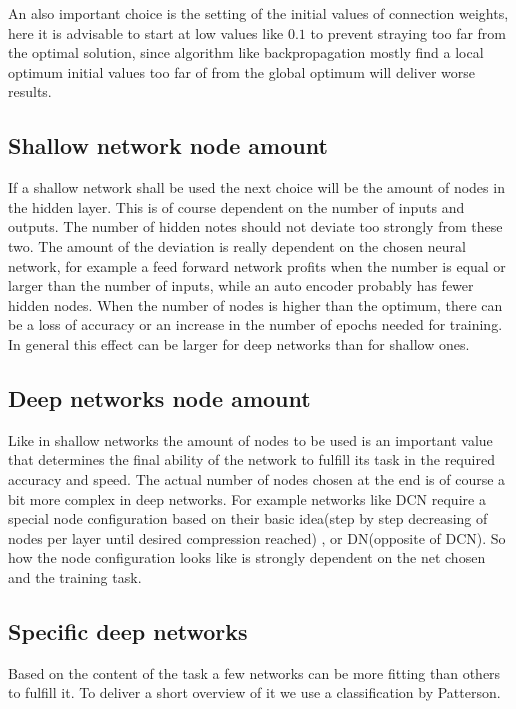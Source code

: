 \documentclass[conference]{IEEEtran}
\begin{document}

An also important choice is the setting of the initial values of connection weights, here it is advisable to start at low values like $0.1$ to prevent straying too far from the optimal solution, since algorithm like backpropagation mostly find a local optimum initial values too far of from the global optimum will deliver worse results.


\subsection{Shallow network node amount}
If a shallow network shall be used the next choice will be the amount of nodes in the hidden layer. This is of course dependent on the number of inputs and outputs. The number of hidden notes should not deviate too strongly from these two. The amount of the deviation is really dependent on the chosen neural network, for example a feed forward network profits when the number is equal or larger than the number of inputs, while an auto encoder probably has fewer hidden nodes. When the number of nodes is higher than the optimum, there can be a loss of accuracy or an increase in the number of epochs needed for training. In general this effect can be larger for deep networks than for shallow ones.


\subsection{Deep networks node amount}
Like in shallow networks the amount of nodes to be used is an important value that determines the final ability of the network to fulfill its task in the required accuracy and speed. The actual number of nodes chosen at the end is of course a bit more complex in deep networks. For example networks like DCN require a special node configuration based on their basic idea(step by step decreasing of nodes per layer until desired compression reached) , or DN(opposite of DCN). So how the node configuration looks like is strongly dependent on the net chosen and the training task.



\subsection{Specific deep networks}
Based on the content of the task a few networks can be more fitting than others to fulfill it. To deliver a short overview of it we use a classification by Patterson\cite{PattersonGibson17}.
\end{document}
